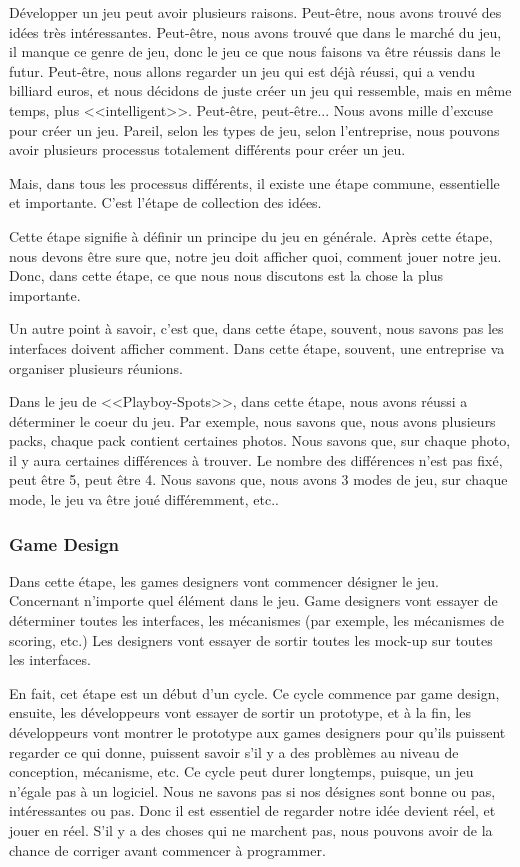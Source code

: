 Développer un jeu peut avoir plusieurs raisons. Peut-être, nous avons trouvé des idées très intéressantes. Peut-être, nous avons trouvé que dans le marché du jeu, il manque ce genre de jeu, donc le jeu ce que nous faisons va être réussis dans le futur. Peut-être, nous allons regarder un jeu qui est déjà réussi, qui a vendu billiard euros, et nous décidons de juste créer un jeu qui ressemble, mais en même temps, plus <<intelligent>>. Peut-être, peut-être... Nous avons mille d'excuse pour créer un jeu. Pareil, selon les types de jeu, selon l'entreprise, nous pouvons avoir plusieurs processus totalement différents pour créer un jeu. 

Mais, dans tous les processus différents, il existe une étape commune, essentielle et importante. C'est l'étape de collection des idées. 

Cette étape signifie à définir un principe du jeu en générale. Après cette étape, nous devons être sure que, notre jeu doit afficher quoi, comment jouer notre jeu. Donc, dans cette étape, ce que nous nous discutons est la chose la plus importante. 

Un autre point à savoir, c'est que, dans cette étape, souvent, nous savons pas les interfaces doivent afficher comment. Dans cette étape, souvent, une entreprise va organiser plusieurs réunions.

Dans le jeu de <<Playboy-Spots>>, dans cette étape, nous avons réussi a déterminer le coeur du jeu. Par exemple, nous savons que, nous avons plusieurs packs, chaque pack contient certaines photos. Nous savons que, sur chaque photo, il y aura certaines différences à trouver. Le nombre des différences n'est pas fixé, peut être 5, peut être 4. Nous savons que, nous avons 3 modes de jeu, sur chaque mode, le jeu va être joué différemment, etc..


\subsubsection{Game Design} %

Dans cette étape, les games designers vont commencer désigner le jeu. Concernant n'importe quel élément dans le jeu. Game designers vont essayer de déterminer toutes les interfaces, les mécanismes (par exemple, les mécanismes de scoring, etc.) Les designers vont essayer de sortir toutes les mock-up sur toutes les interfaces. 

En fait, cet étape est un début d'un cycle. Ce cycle commence par game design, ensuite, les développeurs vont essayer de sortir un prototype, et à la fin, les développeurs vont montrer le prototype aux games designers pour qu'ils puissent regarder ce qui donne, puissent savoir s'il y a des problèmes au niveau de conception, mécanisme, etc. Ce cycle peut durer longtemps, puisque, un jeu n'égale pas à un logiciel. Nous ne savons pas si nos désignes sont bonne ou pas, intéressantes ou pas. Donc il est essentiel de regarder notre idée devient réel, et jouer en réel. S'il y a des choses qui ne marchent pas, nous pouvons avoir de la chance de corriger avant commencer à programmer.

